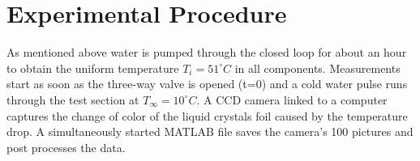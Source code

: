 \section{Experimental Procedure}
As mentioned above water is pumped through the closed loop for about an hour to obtain the uniform  temperature $T_i= 51 ^\circ C$ in all components. Measurements start as soon as the three-way valve is opened (t=0) and a cold water pulse runs through the test section at $T_\infty=10 ^\circ C$. A CCD camera linked to a computer captures the change of color of the liquid crystals foil caused by the temperature drop. A simultaneously started MATLAB file saves the camera's 100 pictures and post processes the data.
